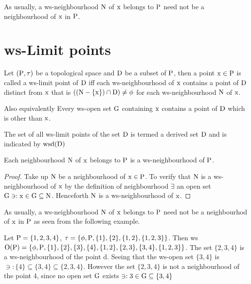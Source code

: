\begin{rem}\label{rem2.5.5} 
As usually, a ws-neighbourhood $\mathrm{N}$ of $\mathrm{x}$ belongs to $\mathrm{P}$ need not be a neighbourhood of $\mathrm{x}$ in $\mathrm{P}$.
\end{rem}

\section{ws-Limit points}\label{sec2.6}

\begin{dfn}\label{defi2.6.1}
Let $(\mathrm{P}, \tau)$ be a topological space and $\mathrm{D}$ be a subset of $\mathrm{P}$, then a point $\mathrm{x}\in \mathrm{P}$ is called a ws-limit point of $\mathrm{D}$ iff each ws-neighbourhood of $\mathrm{x}$ contains a point of $\mathrm{D}$ distinct from $\mathrm{x}$ that is $((\mathrm{N}-\{\mathrm{x}\})\cap \mathrm{D})\neq \phi$ for each ws-neighbourhood $\mathrm{N}$ of $\mathrm{x}$.
\end{dfn}

Also equivalently Every ws-open set $\mathrm{G}$ containing $\mathrm{x}$ contains a point of $\mathrm{D}$ which is other than $\mathrm{x}$.

\begin{dfn}\label{defi2.6.2}
The set of all ws-limit points of the set $\mathrm{D}$ is termed a derived set $\mathrm{D}$ and is indicated by $\mathrm{wsd}(\mathrm{D})$
\end{dfn}

\begin{thm}\label{thm2.6.3}
Each neighbourhood $\mathrm{N}$ of $\mathrm{x}$ belongs to $\mathrm{P}$ is a ws-neighbourhood of $\mathrm{P}$.
\end{thm}

\begin{proof}
Take up $\mathrm{N}$ be a neighbourhood of $\mathrm{x}\in \mathrm{P}$. To verify that $\mathrm{N}$ is a ws-neighbourhood of $\mathrm{x}$ by the definition of neighbourhood $\exists$ an open set $\mathrm{G} \ni: \mathrm{x}\in\mathrm{G}\subseteq \mathrm{N}$. Henceforth $\mathrm{N}$ is a ws-neighbourhood of $\mathrm{x}$.
\end{proof}

\begin{rem}\label{rem2.6.4}
As usually, a ws-neighbourhood $\mathrm{N}$ of $\mathrm{x}$ belongs to $\mathrm{P}$ need not be a neighbourhod of $\mathrm{x}$ in $\mathrm{P}$ as seen from the following example.
\end{rem}

\begin{exm}\label{exam2.6.5}
Let $\mathrm{P} = \{1, 2, 3, 4 \}$, $\tau = \{\phi, \mathrm{P}, \{1\}, \{2\}, \{1, 2\}, \{1, 2, 3\}\}$. Then ws$\mathrm{O}(\mathrm{P})= \{\phi, \mathrm{P}, \{1\}, \{2\}, \{3\}, \{4\},\{1, 2\},\{2, 3\}, \{3, 4\}, \{1, 2, 3\}\}$. The set $\{2, 3, 4\}$ is a ws-neighbourhood of the point d. Seeing that the ws-open set $\{3, 4\}$ is $\ni: \{4\}\subseteq \{3, 4\} \subseteq \{2, 3, 4\}$. However the set $\{2, 3, 4\}$ is not a neighbourhood of the point 4, since no open set $\mathrm{G}$ exists $\ni: 3\in \mathrm{G}\subseteq \{3, 4\}$
\end{exm}
